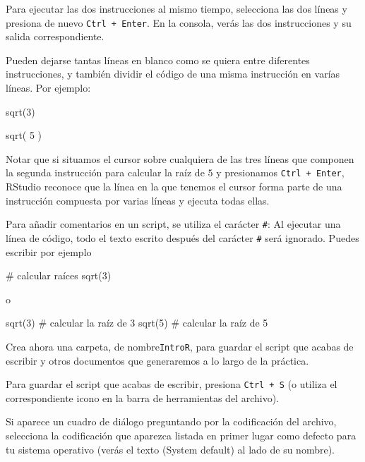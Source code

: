\documentclass[
  degree=mecinf,
  title=normal,
  toc=normal,
  bib=normal]{mnye}
\newenvironment{Shaded}{\begin{snugshade}}{\end{snugshade}}
\newcommand{\FunctionTok}[1]{\textcolor[rgb]{0.00,0.00,0.00}{#1}}
\newcommand{\NormalTok}[1]{#1}
\begin{document}
Para ejecutar las dos instrucciones al mismo tiempo, selecciona las dos líneas y presiona de nuevo \texttt{Ctrl\ +\ Enter}. En la consola, verás las dos instrucciones y su salida correspondiente.

Pueden dejarse tantas líneas en blanco como se quiera entre diferentes instrucciones, y también dividir el código de una misma instrucción en varías líneas. Por ejemplo:

\begin{Shaded}
\begin{Highlighting}[]
\NormalTok{sqrt(3)}

\NormalTok{sqrt(}
\NormalTok{    5}
\NormalTok{)}
\end{Highlighting}
\end{Shaded}

Notar que si situamos el cursor sobre cualquiera de las tres líneas que componen la segunda instrucción para calcular la raíz de \(5\) y presionamos \texttt{Ctrl\ +\ Enter}, \textsf{RStudio} reconoce que la línea en la que tenemos el cursor forma parte de una instrucción compuesta por varias líneas y ejecuta todas ellas.

Para añadir comentarios en un script, se utiliza el carácter \texttt{\#}: Al ejecutar una línea de código, todo el texto escrito después del carácter \texttt{\#} será ignorado. Puedes escribir por ejemplo

\begin{Shaded}
\begin{Highlighting}[]
\FunctionTok{\# calcular raíces }
\NormalTok{sqrt(3)}
\end{Highlighting}
\end{Shaded}

o

\begin{Shaded}
\begin{Highlighting}[]
\NormalTok{sqrt(3) \# calcular la raíz de 3}
\NormalTok{sqrt(5) \# calcular la raíz de 5}
\end{Highlighting}
\end{Shaded}

Crea ahora una carpeta, de nombre\texttt{IntroR}, para guardar el script que acabas de escribir y otros documentos que generaremos a lo largo de la práctica.

Para guardar el script que acabas de escribir, presiona \texttt{Ctrl\ +\ S} (o utiliza el correspondiente icono en la barra de herramientas del archivo).

Si aparece un cuadro de diálogo preguntando por la codificación del archivo, selecciona la codificación que aparezca listada en primer lugar como defecto para tu sistema operativo (verás el texto (System default) al lado de su nombre).
\end{document}
